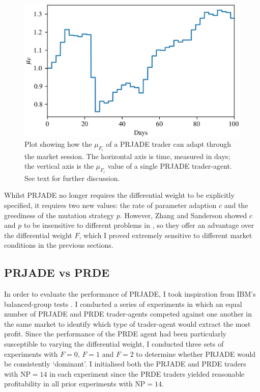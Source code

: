 \documentclass[conference]{IEEEtran}
\begin{document}
\begin{figure}[htbp]
    \centerline{\includegraphics[width=\columnwidth]{mu_F_2.0.png}}
    \caption{
        Plot showing how the $\mu_{F_i}$ of a PRJADE trader can adapt through the market session.
        The horizontal axis is time, measured in days; the vertical axis is the $\mu_{F_i}$ value of a single PRJADE trader-agent.
        See text for further discussion.
    }
    \label{mu_F}
\end{figure}

Whilst PRJADE no longer requires the differential weight to be explicitly specified, it requires two new values: the rate of parameter adaption $c$ and the greediness of the mutation strategy $p$.
However, Zhang and Sanderson showed $c$ and $p$ to be insensitive to different problems in \cite{ZhangSanderson}, so they offer an advantage over the differential weight $F$, which I proved extremely sensitive to different market conditions in the previous sections.

\subsection{PRJADE vs PRDE}

In order to evaluate the performance of PRJADE, I took inspiration from IBM's balanced-group tests \cite{TesauroDas}.
I conducted a series of experiments in which an equal number of PRJADE and PRDE trader-agents competed against one another in the same market to identify which type of trader-agent would extract the most profit.
Since the performance of the PRDE agent had been particularly susceptible to varying the differential weight, I conducted three sets of experiments with $F=0$, $F=1$ and $F=2$ to determine whether PRJADE would be consistently `dominant'.
I initialised both the PRJADE and PRDE traders with $\mathrm{NP}=14$ in each experiment since the PRDE traders yielded reasonable profitability in all prior experiments with $\mathrm{NP}=14$.
\end{document}
